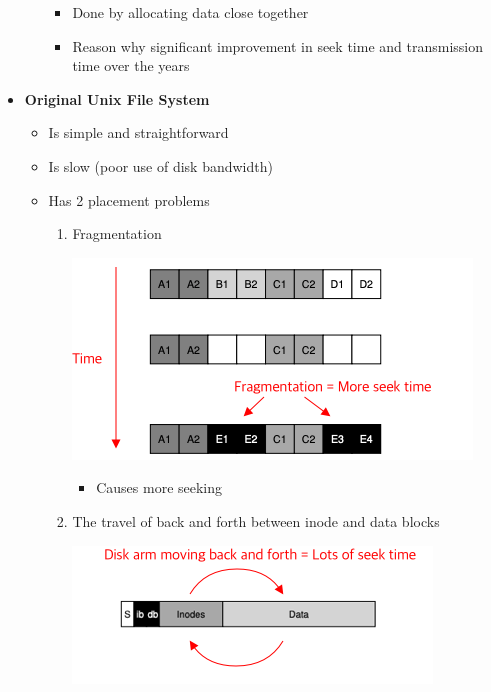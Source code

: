 \documentclass[12pt]{article}
\begin{document}
\begin{itemize}
\begin{itemize}
        \begin{itemize}
            \item Done by allocating data close together
            \item Reason why significant improvement in seek time and transmission time over the years
        \end{itemize}
    \end{itemize}
    \item \textbf{Original Unix File System}
    \begin{itemize}
        \item Is simple and straightforward
        \item Is slow (poor use of disk bandwidth)
        \item Has 2 placement problems
        \begin{enumerate}[1.]
            \item Fragmentation
            \begin{center}
            \includegraphics[width=0.8\linewidth]{images/notes_6.png}
            \end{center}

            \begin{itemize}
                \item Causes more seeking
            \end{itemize}
            \item The travel of back and forth between inode and data blocks

            \begin{center}
            \includegraphics[width=0.8\linewidth]{images/notes_7.png}
            \end{center}


\end{enumerate}
\end{itemize}
\end{itemize}
\end{document}
